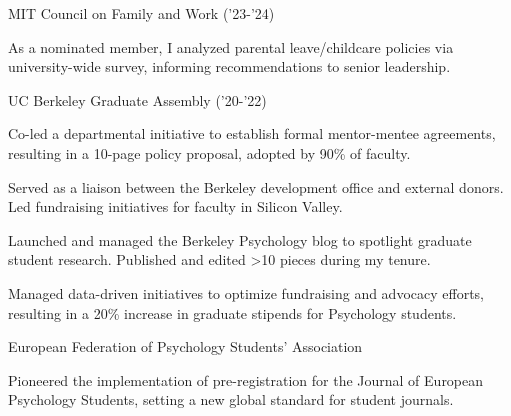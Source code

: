 

\begin{cventries}
  \cventry 
    {MIT Council on Family and Work ('23-'24)} %
    {}
    {}
    {} %
    {
      \begin{cvitems} %
        \item {As a nominated member, I analyzed parental leave/childcare policies via university-wide survey, informing recommendations to senior leadership.}
      \end{cvitems}
    }
    
  \cventry 
    {UC Berkeley Graduate Assembly ('20-'22)} %
    {}
    {} %
    {} %
    {
      \begin{cvitems} %
      \item{Co-led a departmental initiative to establish formal mentor-mentee agreements, resulting in a 10-page policy proposal, adopted by 90\% of faculty.}
      \item{Served as a liaison between the Berkeley development office and external donors. Led fundraising initiatives for faculty in Silicon Valley.}
      \item{Launched and managed the Berkeley Psychology blog to spotlight graduate student research. Published and edited >10 pieces during my tenure.}
      \item {Managed data-driven initiatives to optimize fundraising and advocacy efforts, resulting in a 20\% increase in graduate stipends for Psychology students.}
      \end{cvitems}
      }   
       
  \cventry  
    {European Federation of Psychology Students' Association}
    {} %
    {} %
    {} %
    {
      \begin{cvitems} %
      \item {Pioneered the implementation of pre-registration for the Journal of European Psychology Students, setting a new global standard for student journals.}
      \end{cvitems}
      }

\end{cventries}



